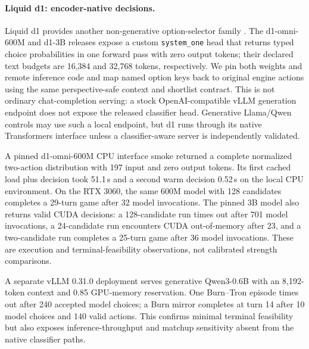 \documentclass[11pt,a4paper]{article}
\theoremstyle{definition}
\theoremstyle{plain}
\begin{document}
\paragraph{Liquid d1: encoder-native decisions.}
Liquid d1 provides another non-generative option-selector family
\citep{liquidai2026d1}. The d1-omni-600M and d1-3B releases expose a custom
\texttt{system\_one} head that returns typed choice probabilities in one
forward pass with zero output tokens; their declared text budgets are 16,384
and 32,768 tokens, respectively. We pin both weights and remote inference code
and map named option keys back to original engine actions using the same
perspective-safe context and shortlist contract. This is not ordinary
chat-completion serving: a stock OpenAI-compatible vLLM generation endpoint
does not expose the released classifier head. Generative Llama/Qwen controls
may use such a local endpoint, but d1 runs through its native Transformers
interface unless a classifier-aware server is independently validated.

A pinned d1-omni-600M CPU interface smoke returned a complete normalized
two-action distribution with 197 input and zero output tokens. Its first
cached load plus decision took 51.1\,s and a second warm decision 0.52\,s on
the local CPU environment. On the RTX 3060, the same 600M model with 128
candidates completes a 29-turn game after 32 model invocations. The pinned
3B model also returns valid CUDA decisions: a 128-candidate run times out
after 701 model invocations, a 24-candidate run encounters CUDA
out-of-memory after 23, and a two-candidate run completes a 25-turn game
after 36 model invocations. These are execution and terminal-feasibility
observations, not calibrated strength comparisons.

A separate vLLM 0.31.0 deployment serves generative Qwen3-0.6B with an
8,192-token context and 0.85 GPU-memory reservation. One Burn--Tron episode
times out after 240 accepted model choices; a Burn mirror completes at turn
14 after 10 model choices and 140 valid actions. This confirms minimal
terminal feasibility but also exposes inference-throughput and matchup
sensitivity absent from the native classifier paths.
\end{document}
